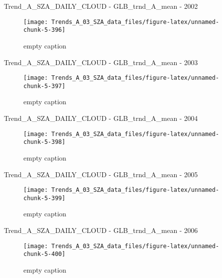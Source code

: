 \documentclass[
  10pt,
  a4paper,oneside]{article}
\begin{document}
Trend\_A\_SZA\_DAILY\_CLOUD - GLB\_trnd\_A\_mean - 2002

\begin{figure}[!ht]

{\centering \texttt{[image: Trends\_A\_03\_SZA\_data\_files/figure-latex/unnamed-chunk-5-396]} 

}

\caption{ empty caption }\label{fig:unnamed-chunk-5-396}
\end{figure}

Trend\_A\_SZA\_DAILY\_CLOUD - GLB\_trnd\_A\_mean - 2003

\begin{figure}[!ht]

{\centering \texttt{[image: Trends\_A\_03\_SZA\_data\_files/figure-latex/unnamed-chunk-5-397]} 

}

\caption{ empty caption }\label{fig:unnamed-chunk-5-397}
\end{figure}

Trend\_A\_SZA\_DAILY\_CLOUD - GLB\_trnd\_A\_mean - 2004

\begin{figure}[!ht]

{\centering \texttt{[image: Trends\_A\_03\_SZA\_data\_files/figure-latex/unnamed-chunk-5-398]} 

}

\caption{ empty caption }\label{fig:unnamed-chunk-5-398}
\end{figure}

Trend\_A\_SZA\_DAILY\_CLOUD - GLB\_trnd\_A\_mean - 2005

\begin{figure}[!ht]

{\centering \texttt{[image: Trends\_A\_03\_SZA\_data\_files/figure-latex/unnamed-chunk-5-399]} 

}

\caption{ empty caption }\label{fig:unnamed-chunk-5-399}
\end{figure}

Trend\_A\_SZA\_DAILY\_CLOUD - GLB\_trnd\_A\_mean - 2006

\begin{figure}[!ht]

{\centering \texttt{[image: Trends\_A\_03\_SZA\_data\_files/figure-latex/unnamed-chunk-5-400]} 

}

\caption{ empty caption }\label{fig:unnamed-chunk-5-400}
\end{figure}
\end{document}
